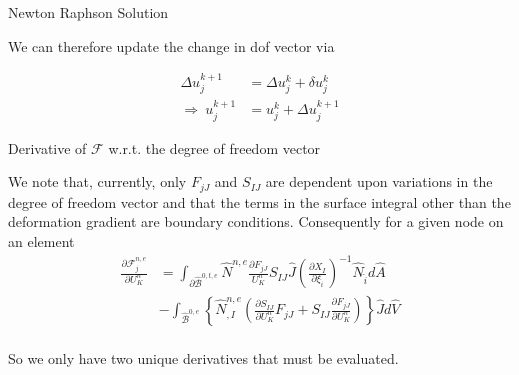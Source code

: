 \documentclass[11pt]{beamer}
\begin{document}
\begin{frame}{Newton Raphson Solution}

We can therefore update the change in dof vector via

\begin{align*}
\Delta u_j^{k+1} &= \Delta u_j^k + \delta u_j^k\\
\Rightarrow\ u_j^{k+1} &= u_j^k + \Delta u_j^{k+1}
\end{align*}

\end{frame}

\begin{frame}{Derivative of $\mathcal{F}$ w.r.t. the degree of freedom vector}

We note that, currently, only $F_{jJ}$ and $S_{IJ}$ are dependent upon variations in the degree of freedom vector and that the terms in the surface integral other than the deformation gradient are boundary conditions. Consequently for a given node on an element
\begin{align*}
\frac{\partial \mathcal{F}_{j}^{n,e}}{\partial U_K^n} &= \int_{\partial \hat{\mathcal{B}}^{0,t,e}} \hat{N}^{n,e} \frac{\partial F_{jJ}}{U_K^n} S_{IJ} \hat{J} \left(\frac{\partial X_{I}}{\partial \xi_{\hat{i}}}\right)^{-1} \hat{N}_{\hat{i}} d\hat{A}\\ &- \int_{\hat{\mathcal{B}}^{0,e}} \left\{ \hat{N}^{n,e}_{,I} \left(\frac{\partial S_{IJ}}{\partial U_K^n} F_{jJ} + S_{IJ} \frac{\partial F_{jJ}}{\partial U_K^n}\right)\right\} \hat{J} d\hat{V}\\
\end{align*}

So we only have two unique derivatives that must be evaluated.

\end{frame}
\end{document}

